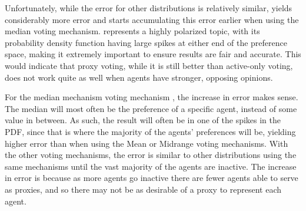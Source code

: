 Unfortunately, while the error for other distributions is relatively similar,
 yields considerably more error and starts accumulating
this error earlier when using the median voting mechanism.
 represents a highly polarized topic, with its probability
density function having large spikes at either end of the preference space, making it
extremely important to ensure results are fair and accurate.
This would indicate that proxy voting, while it is still better than active-only
voting, does not work quite as well when agents have stronger, opposing opinions.



For the median mechanism voting mechanism , the increase in error makes sense.
The median will most often be the preference of a specific agent, instead of some
value in between.
As such, the result will often be in one of the spikes in the PDF, since that is
where the majority of the agents' preferences will be, yielding higher error than when
using the Mean or Midrange voting mechanisms.
With the other voting mechanisms, the error is similar to other distributions using
the same mechanisms until the vast majority of the agents are inactive.
The increase in error is because as more agents go inactive there are fewer agents able
to serve as proxies, and so there may not be as desirable of a proxy to represent
each agent.


